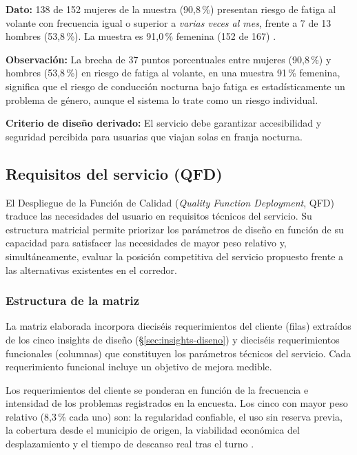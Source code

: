 \textbf{Dato:} 138 de 152 mujeres de la muestra (90{,}8\,\%)
presentan riesgo de fatiga al volante con frecuencia igual o
superior a \emph{varias veces al mes}, frente a 7 de 13 hombres
(53{,}8\,\%). La muestra es 91{,}0\,\% femenina (152 de 167)
\parencite{LouridoRegueira2026}.

\textbf{Observación:} La brecha de 37 puntos porcentuales entre mujeres (90{,}8\,\%) y hombres (53{,}8\,\%) en riesgo de fatiga al volante, en una muestra 91\,\% femenina, significa que el riesgo de conducción nocturna bajo fatiga es estadísticamente un problema de género, aunque el sistema lo trate como un riesgo individual.

\textbf{Criterio de diseño derivado:} El servicio debe
garantizar accesibilidad y seguridad percibida para usuarias
que viajan solas en franja nocturna.

\subsection{Requisitos del servicio (QFD)}\label{sec:qfd}

El Despliegue de la Función de Calidad (\textit{Quality Function Deployment},
QFD) traduce las necesidades del usuario en requisitos técnicos del servicio.
Su estructura matricial permite priorizar los parámetros de diseño en función
de su capacidad para satisfacer las necesidades de mayor peso relativo y,
simultáneamente, evaluar la posición competitiva del servicio propuesto
frente a las alternativas existentes en el corredor.

\subsubsection{Estructura de la matriz}
\label{sec:qfd-estructura}

La matriz elaborada incorpora dieciséis requerimientos del cliente (filas)
extraídos de los cinco insights de diseño (§\ref{sec:insights-diseno}) y
dieciséis requerimientos funcionales (columnas) que constituyen los
parámetros técnicos del servicio. Cada requerimiento funcional incluye
un objetivo de mejora medible.

Los requerimientos del cliente se ponderan en función de la frecuencia e
intensidad de los problemas registrados en la encuesta. Los cinco con
mayor peso relativo (8,3\,\% cada uno) son: la regularidad confiable,
el uso sin reserva previa, la cobertura desde el municipio de origen,
la viabilidad económica del desplazamiento y el tiempo de descanso real
tras el turno \parencite{LouridoRegueira2026}.

